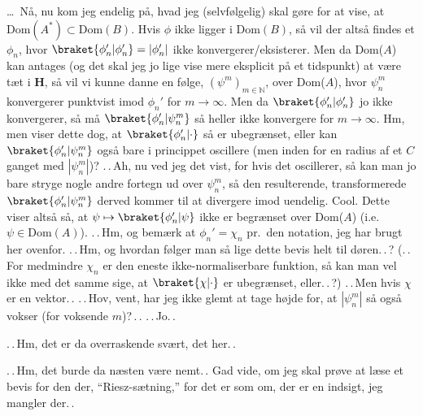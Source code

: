 \documentclass{report}
\begin{document}
\ldots\ Nå, nu kom jeg endelig på, hvad jeg (selvfølgelig) skal gøre for at vise, at $\mathrm{Dom}(A^*) \subset \mathrm{Dom}(B)$. Hvis $\phi$ ikke ligger i Dom$(B)$, så vil der altså findes et $\phi_n$, hvor $\braket{\phi_n' | \phi_n'} = |\phi_n'|$ ikke konvergerer/eksisterer. Men da Dom($A$) kan antages (og det skal jeg jo lige vise mere eksplicit på et tidspunkt) at være tæt i \textbf{H}, så vil vi kunne danne en følge, $(\psi^m)_{m\in\mathbb{N}}$, over Dom($A$), hvor $\psi^m_n$ konvergerer punktvist imod $\phi_n'$ for $m\to \infty$. Men da $\braket{\phi_n' | \phi_n'}$ jo ikke konvergerer, så må $\braket{\phi_n' | \psi^m_n}$ så heller ikke konvergere for $m\to\infty$. Hm, men viser dette dog, at $\braket{\phi_n' | \cdot}$ så er ubegrænset, eller kan $\braket{\phi_n' | \psi^m_n}$ også bare i princippet oscillere (men inden for en radius af et $C$ ganget med $|\psi^m_n|$)? .\,.\,Ah, nu ved jeg det vist, for hvis det oscillerer, så kan man jo bare stryge nogle andre fortegn ud over $\psi^m_n$, så den resulterende, transformerede $\braket{\phi_n' | \psi^m_n}$ derved kommer til at divergere imod uendelig. Cool. Dette viser altså så, at $\psi \mapsto \braket{\phi_n' | \psi}$ ikke er begrænset over Dom($A$) (i.e.\ $\psi\in\mathrm{Dom}(A)$). .\,.\,Hm, og bemærk at $\phi_n' = \chi_n$ pr.\ den notation, jeg har brugt her ovenfor. .\,.\,Hm, og hvordan følger man så lige dette bevis helt til døren.\,.\,? (.\,.\,For medmindre $\chi_n$ er den eneste ikke-normaliserbare funktion, så kan man vel ikke med det samme sige, at $\braket{\chi | \cdot}$ er ubegrænset, eller.\,.\,?) .\,.\,Men hvis $\chi$ er en vektor.\,. .\,.\,Hov, vent, har jeg ikke glemt at tage højde for, at $|\psi^m_n|$ så også vokser (for voksende $m$)?\,.\,.  .\,.\,Jo.\,. 

.\,.\,Hm, det er da overraskende svært, det her.\,. 

.\,.\,Hm, det burde da næsten være nemt.\,. Gad vide, om jeg skal prøve at læse et bevis for den der, ``Riesz-sætning,'' for det er som om, der er en indsigt, jeg mangler der.\,. 

\end{document}
